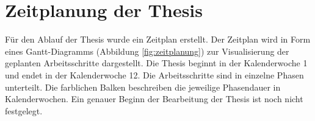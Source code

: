 
\section{Zeitplanung der Thesis}

Für den Ablauf der Thesis wurde ein Zeitplan erstellt. Der Zeitplan wird in Form eines Gantt-Diagramms%
(Abbildung \ref{fig:zeitplanung}) zur Visualisierung der geplanten Arbeitsschritte dargestellt. Die Thesis beginnt in der Kalenderwoche 1 und endet in der Kalenderwoche 12. Die Arbeitsschritte sind in einzelne Phasen unterteilt. Die farblichen Balken beschreiben die jeweilige Phasendauer in Kalenderwochen. Ein genauer Beginn der Bearbeitung der Thesis ist noch nicht festgelegt.



